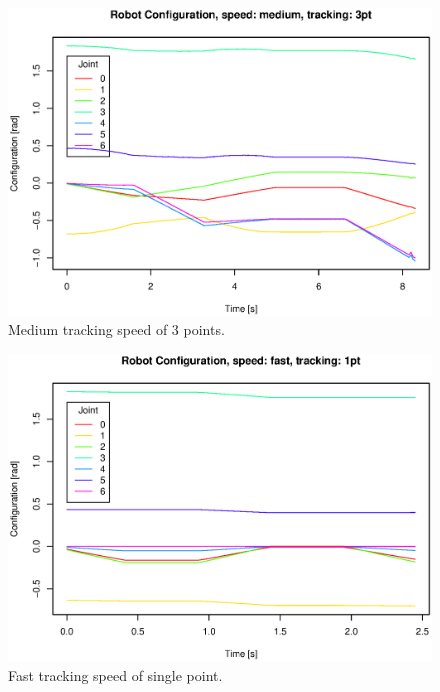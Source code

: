 \begin{figure}[H]
\centering
\includegraphics[width= \fullImageWidth]{graphics/robotics/robotConfiguration_medium_3pt}
\caption{Medium tracking speed of 3 points.}
\label{fig:robotic_conf_medium_3pt}
\end{figure}

\begin{figure}[H]
\centering
\includegraphics[width= \fullImageWidth]{graphics/robotics/robotConfiguration_fast_1pt}
\caption{Fast tracking speed of single point.}
\label{fig:robotic_conf_fast_1pt}
\end{figure}

